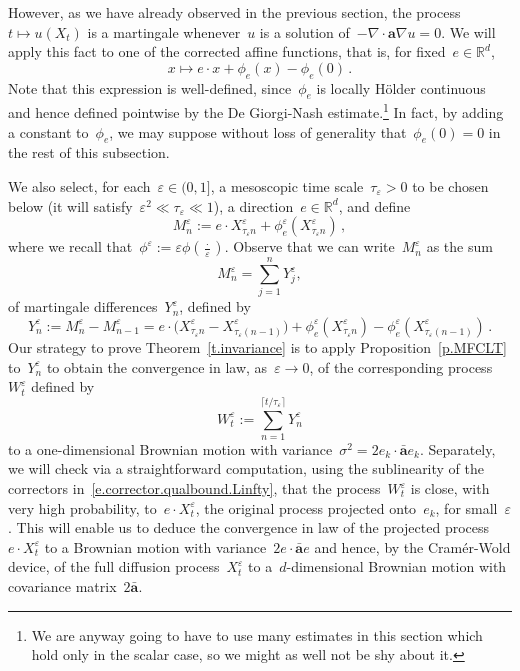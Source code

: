 \documentclass[11pt]{article} %
\numberwithin{equation}{section}
\theoremstyle{definition}
\newcommand*{\Rd}{\ensuremath{\mathbb{R}^d}}
\newcommand{\eps}{\varepsilon}
\newcommand{\ep}{\eps}
\renewcommand{\a}{\mathbf{a}}
\newcommand{\ahom}{\bar{\a}}
\begin{document}
\smallskip

However, as we have already observed in the previous section, the process $t\mapsto u (X_t)$ is a martingale whenever~$u$ is a solution of~$-\nabla \cdot \a\nabla u = 0$. We will apply this fact to one of the corrected affine functions, that is, for fixed~$e \in\Rd$, 
\begin{equation*}
x\mapsto e \cdot x + \phi_{e}(x) - \phi_{e}(0)
\,.
\end{equation*}
Note that this expression is well-defined, since~$\phi_e$ is locally H\"older continuous and hence defined pointwise by the De Giorgi-Nash estimate.\footnote{We are anyway going to have to use many estimates in this section which hold only in the scalar case, so we might as well not be shy about it.} In fact, by adding a constant to~$\phi_e$, we may suppose without loss of generality that~$\phi_e(0)=0$ in the rest of this subsection. 

\smallskip

We also select, for each~$\ep \in (0,1]$, a mesoscopic time scale~$\tau_\ep >0$ to be chosen below (it will satisfy~$\ep^2 \ll \tau_\ep \ll 1$), 
a direction~$e \in\Rd$, and define
\begin{equation*}
M^\ep_n := e \cdot X^{\ep}_{\tau_\ep n} + \phi^\ep_{e}(X^{\ep}_{\tau_\ep n}) \,,
\end{equation*}
where we recall that~$\phi^\ep := \ep \phi(\frac \cdot \ep)$. 
Observe that we can write~$M^\ep_n$ as the sum 
\begin{equation*}
M^\ep_n = \sum_{j=1}^n Y^\ep_j, 
\end{equation*}
of martingale differences~$Y^\ep_n$, defined by
\begin{equation*}
Y^\ep_n := M^\ep_n - M^\ep_{n-1}
=
e\cdot \bigl( X^{\ep}_{{\tau_\ep}n} - X^{\ep}_{{\tau_\ep}(n-1)} \bigr)  
+ 
\phi^\ep_{e}(X^{\ep}_{{\tau_\ep}n}) - \phi^\ep_{e}(X^{\ep}_{{\tau_\ep}(n-1)})
\,.
\end{equation*}
Our strategy to prove Theorem~\ref{t.invariance} is to apply Proposition~\ref{p.MFCLT} to~$Y^{\ep}_n$ to obtain the convergence in law, as~$\ep\to0$, of the corresponding process~$W^\ep_t$ defined by
\begin{equation*}
W^\ep_t
:=
\sum_{n=1}^{\lceil t/\tau_\ep \rceil}
Y^\ep_n
\end{equation*}
to a one-dimensional Brownian motion with variance~$\sigma^2 = 2 e_k \cdot \ahom e_k$. 
Separately, we will check via a straightforward computation, using the sublinearity of the correctors in~\eqref{e.corrector.qualbound.Linfty}, that the process~$W^\ep_t$ is close, with very high probability, to~$e\cdot X^{\ep}_t$, the original process projected onto~$e_k$, for small~$\ep$. This will enable us to deduce the convergence in law of the projected process~$e \cdot X^{\ep}_t$ to a Brownian motion with variance~$2e\cdot \ahom e$ and hence, by the Cram\'er-Wold device, of the full diffusion process~$X^{\ep}_t$ to a~$d$-dimensional Brownian motion with covariance matrix~$2\ahom$. 
\end{document}
